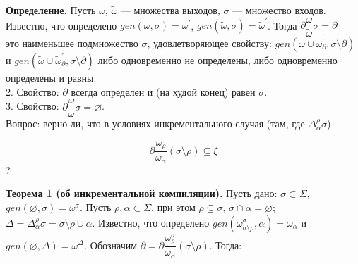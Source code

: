 





\hrulefill

\textbf{Определение.} Пусть $\omega$, $\tilde{\omega}$ --- множества выходов, $\sigma$ --- множество входов. Известно, что определено $gen(\omega, \sigma) = \omega^\prime$, $gen(\tilde{\omega}, \sigma) = \tilde{\omega}^\prime$. Тогда $\partial\dfrac{\omega}{\tilde{\omega}}\sigma = \partial$ --- это наименьшее подмножество $\sigma$, удовлетворяющее свойству: 
$gen(\omega \cup \omega^\prime_{\partial}, \sigma\setminus\partial)$ и
$gen(\tilde{\omega} \cup \tilde{\omega}^\prime_{\partial}, \sigma\setminus\partial)$ либо одновременно не определены, либо одновременно определены и равны. 
\\

2. Свойство: $\partial$ всегда определен и (на худой конец) равен $\sigma$.
\\

3. Свойство: $\partial\dfrac{\omega}{\omega}\sigma = \varnothing$.
\\

Вопрос: верно ли, что в условиях инкрементального случая (там, где $\Delta^\rho_\alpha\sigma$)

$$\partial\dfrac{\omega_\rho}{\omega_\alpha}(\sigma\setminus\rho)\subseteq\xi$$ ?

\begin{comment}
	\textbf{Доказательство:}

	\newcommand{\mypart}{\partial\dfrac{\omega_\rho}{\omega_\alpha}(\sigma\setminus\rho)}

	Докажем, что если $s \in \sigma\setminus\rho$, $s \notin \xi$, то $s \notin \mypart$. Обозначим $\tau = (\sigma\setminus\rho)\setminus\mypart$, тогда $\tau$ --- наибольшее подмножество $\sigma\setminus\rho$, такое, что $gen(\omega_\rho, \tau)$ определено $\Leftrightarrow$ $gen(\omega_\alpha, \tau)$ определено. Предположим, $s \in \mypart$, тогда $s \notin \tau$. Рассмотрим $gen(\omega_\rho, \tau)$.
\end{comment}

\newpage

\newcommand{\butpartial}{\sigma\setminus\rho\setminus\partial}

\textbf{Теорема 1 (об инкрементальной компиляции).} Пусть дано: $\sigma \subset \Sigma$, $gen(\varnothing, \sigma) = \omega^\sigma$. Пусть $\rho, \alpha \subset \Sigma$, при этом $\rho \subseteq \sigma$, $\sigma \cap \alpha = \varnothing$; $\Delta = \Delta^\rho_\alpha\sigma = \sigma\setminus\rho\cup\alpha$. Известно, что определено $gen(\omega^\sigma_{\sigma\setminus\rho}, \alpha) = \omega_\alpha$ и $gen(\varnothing, \Delta) = \omega^\Delta$. Обозначим $\partial = \partial\dfrac{\omega^\sigma_\rho}{\omega_\alpha}(\sigma\setminus\rho)$.
Тогда:

